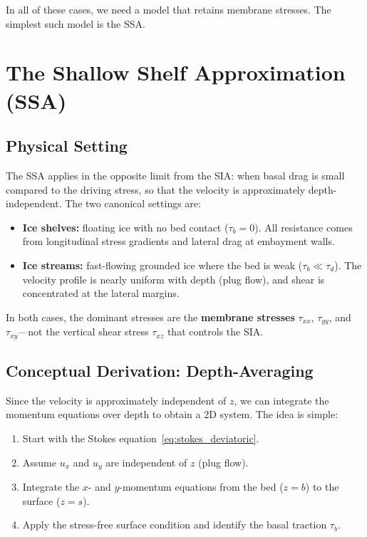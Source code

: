 \documentclass[11pt]{article}
\begin{document}
\noindent In all of these cases, we need a model that retains membrane stresses.  The simplest such model is the SSA.

\section{The Shallow Shelf Approximation (SSA)}

\subsection{Physical Setting}

The SSA applies in the opposite limit from the SIA: when basal drag is small compared to the driving stress, so that the velocity is approximately depth-independent.  The two canonical settings are:
\begin{itemize}[nosep]
  \item \textbf{Ice shelves:} floating ice with no bed contact ($\tau_b = 0$).  All resistance comes from longitudinal stress gradients and lateral drag at embayment walls.
  \item \textbf{Ice streams:} fast-flowing grounded ice where the bed is weak ($\tau_b \ll \tau_d$).  The velocity profile is nearly uniform with depth (plug flow), and shear is concentrated at the lateral margins.
\end{itemize}

\noindent In both cases, the dominant stresses are the \textbf{membrane stresses} $\tau_{xx}$, $\tau_{yy}$, and $\tau_{xy}$---not the vertical shear stress $\tau_{xz}$ that controls the SIA.

\subsection{Conceptual Derivation: Depth-Averaging}

Since the velocity is approximately independent of $z$, we can integrate the momentum equations over depth to obtain a 2D system.  The idea is simple:
\begin{enumerate}[nosep]
  \item Start with the Stokes equation~\eqref{eq:stokes_deviatoric}.
  \item Assume $u_x$ and $u_y$ are independent of $z$ (plug flow).
  \item Integrate the $x$- and $y$-momentum equations from the bed ($z = b$) to the surface ($z = s$).
  \item Apply the stress-free surface condition and identify the basal traction $\tau_{b}$.
\end{enumerate}
\end{document}
